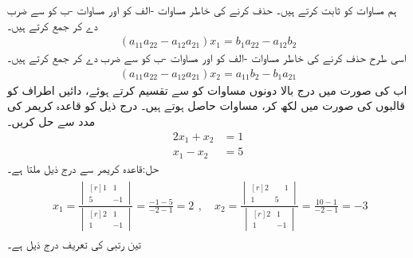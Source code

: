 ہم مساوات  کو ثابت کرتے ہیں۔   حذف کرنے کی خاطر مساوات -الف کو  اور مساوات -ب کو  سے ضرب دے کر جمع کرتے ہیں۔
\begin{align*}
(a_{11}a_{22}-a_{12}a_{21})x_1=b_1a_{22}-a_{12}b_2
\end{align*} 
اسی طرح  حذف کرنے کی خاطر  مساوات -الف کو  اور مساوات -ب کو  سے ضرب دے کر جمع کرتے ہیں۔
\begin{align*}
(a_{11}a_{22}-a_{12}a_{21})x_2=a_{11}b_2-b_1a_{21}
\end{align*}
اب  کی صورت میں درج بالا دونوں مساوات کو  سے  تقسیم کرتے ہوئے، دائیں اطراف کو قالبوں کی صورت میں لکھ کر،  مساوات  حاصل ہوتے ہیں۔
درج ذیل کو قاعدہ کریمر کی مدد سے حل کریں۔
\begin{align*}
2x_1+x_2&=1\\
x_1-x_2&=5
\end{align*}
حل:قاعدہ کریمر سے درج ذیل ملتا ہے۔
\begin{gather*}
\begin{aligned}
x_1=\frac{\begin{vmatrix*}[r] 1&1\\5&-1 \end{vmatrix*}}{\begin{vmatrix*}[r] 2&1\\1&-1 \end{vmatrix*}}=\frac{-1-5}{-2-1}=2
\end{aligned},\quad
x_2=\frac{\begin{vmatrix*}[r] 2&\phantom{-}1\\1&5 \end{vmatrix*}}{\begin{vmatrix*}[r]  2&1\\1&-1\end{vmatrix*}}=\frac{10-1}{-2-1}=-3
\end{gather*} 
تین رتبی  کی تعریف درج ذیل ہے۔
